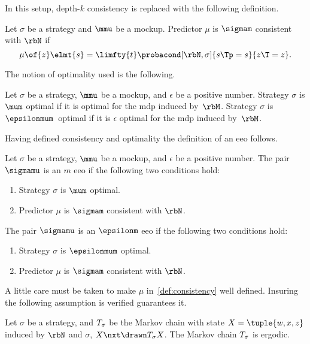 In this setup, depth-\(k\) consistency is replaced with the following definition.
\begin{definition}
\label{def:consistency}
Let \(\sigma\) be a strategy and \(\mmu\) be a mockup.
Predictor \(\mu\) is \(\sigmam\) consistent with \(\rbN\) if
\[
\mu \of{z} \elmt{s} = \limfty{t}\probacond[\rbN, \sigma]{s\Tp = s}{z\T = z}.
\]
\end{definition}

The notion of optimality used is the following.
\begin{definition}
Let \(\sigma\) be a strategy, \(\mmu\) be a mockup, and \(\epsilon\) be a positive number.
Strategy \(\sigma\) is \(\mum\) optimal if it is optimal for the \ac{mdp} induced by~\(\rbM\).
Strategy \(\sigma\) is \(\epsilonmum\)~optimal if it is \(\epsilon\) optimal for the \ac{mdp} induced by~\(\rbM\).
\end{definition}

Having defined consistency and optimality the definition of an \ac{eeo} follows.
\begin{definition}
Let \(\sigma\) be a strategy, \(\mmu\) be a mockup, and \(\epsilon\) be a positive number.
The pair \(\sigmamu\) is an \(m\) \ac{eeo} if the following two conditions hold:
\begin{enumerate}
\item Strategy \(\sigma\) is \(\mum\) optimal.
\item Predictor \(\mu\) is \(\sigmam\) consistent with \(\rbN\).
\end{enumerate}
The pair \(\sigmamu\) is an \(\epsilonm\) \ac{eeo} if the following two conditions hold:
\begin{enumerate}
\item Strategy \(\sigma\) is \(\epsilonmum\) optimal.
\item Predictor \(\mu\) is \(\sigmam\) consistent with \(\rbN\).
\end{enumerate}
\end{definition}

A little care must be taken to make \(\mu\) in~\cref{def:consistency} well defined.
Insuring the following assumption is verified guarantees it.
\begin{assumption}
\label{ass:ergodicity}
Let \(\sigma\) be a strategy, and \(T_{\sigma}\) be the Markov chain with state \(X = \tuple{w, x, z}\) induced by \(\rbN\) and \(\sigma\), \(X\nxt \drawn T\strat{\sigma} X\).
The Markov chain \(T_{\sigma}\) is ergodic.
\end{assumption}

